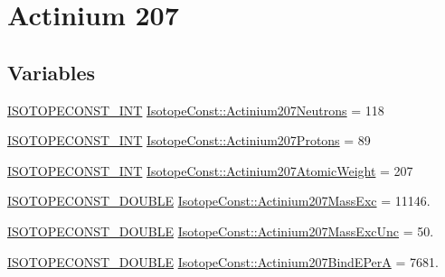 \hypertarget{group___isotope_const-_actinium-_ac207}{}\section{Actinium 207}
\label{group___isotope_const-_actinium-_ac207}
\subsection*{Variables}
\begin{DoxyCompactItemize}
\item 
\mbox{\hyperlink{group___isotope_const-_macros_ga5f18360b3e99483a35c32d789e62621c}{I\+S\+O\+T\+O\+P\+E\+C\+O\+N\+S\+T\+\_\+\+I\+NT}} \mbox{\hyperlink{group___isotope_const-_actinium-_ac207_ga56b9db7f315bd2feed7385cf2b15d26a}{Isotope\+Const\+::\+Actinium207\+Neutrons}} = 118
\item 
\mbox{\hyperlink{group___isotope_const-_macros_ga5f18360b3e99483a35c32d789e62621c}{I\+S\+O\+T\+O\+P\+E\+C\+O\+N\+S\+T\+\_\+\+I\+NT}} \mbox{\hyperlink{group___isotope_const-_actinium-_ac207_gaeae56f04fbfb715110cfcf65a211f2d1}{Isotope\+Const\+::\+Actinium207\+Protons}} = 89
\item 
\mbox{\hyperlink{group___isotope_const-_macros_ga5f18360b3e99483a35c32d789e62621c}{I\+S\+O\+T\+O\+P\+E\+C\+O\+N\+S\+T\+\_\+\+I\+NT}} \mbox{\hyperlink{group___isotope_const-_actinium-_ac207_ga3133625b943553e919dff45b9c447dc3}{Isotope\+Const\+::\+Actinium207\+Atomic\+Weight}} = 207
\item 
\mbox{\hyperlink{group___isotope_const-_macros_ga8f45a7272ce02c0b4c65c44636ed719a}{I\+S\+O\+T\+O\+P\+E\+C\+O\+N\+S\+T\+\_\+\+D\+O\+U\+B\+LE}} \mbox{\hyperlink{group___isotope_const-_actinium-_ac207_ga413c9cb6e026db3c492a8f39105569e9}{Isotope\+Const\+::\+Actinium207\+Mass\+Exc}} = 11146.
\item 
\mbox{\hyperlink{group___isotope_const-_macros_ga8f45a7272ce02c0b4c65c44636ed719a}{I\+S\+O\+T\+O\+P\+E\+C\+O\+N\+S\+T\+\_\+\+D\+O\+U\+B\+LE}} \mbox{\hyperlink{group___isotope_const-_actinium-_ac207_ga9f777e3c53b837f6eef326786f5e4aee}{Isotope\+Const\+::\+Actinium207\+Mass\+Exc\+Unc}} = 50.
\item 
\mbox{\hyperlink{group___isotope_const-_macros_ga8f45a7272ce02c0b4c65c44636ed719a}{I\+S\+O\+T\+O\+P\+E\+C\+O\+N\+S\+T\+\_\+\+D\+O\+U\+B\+LE}} \mbox{\hyperlink{group___isotope_const-_actinium-_ac207_gad8eeee8b7ab05e09d317d25e1a5df117}{Isotope\+Const\+::\+Actinium207\+Bind\+E\+PerA}} = 7681.
\item 

\end{DoxyCompactItemize}
